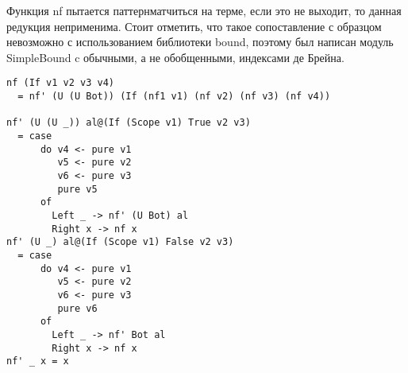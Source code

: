 Функция nf пытается паттернматчиться на терме, если это не выходит, то данная редукция неприменима. Стоит отметить, что такое сопоставление с образцом невозможно с использованием библиотеки bound\cite{bound}, поэтому был написан модуль SimpleBound c обычными, а не обобщенными, индексами де Брейна.


\begin{lstlisting}[caption={Приведение в нормальную форму пытается применить все редукции данного функционального символа},captionpos=b, frame=single, float, floatplacement=H]
nf (If v1 v2 v3 v4)
  = nf' (U (U Bot)) (If (nf1 v1) (nf v2) (nf v3) (nf v4))

nf' (U (U _)) al@(If (Scope v1) True v2 v3)
  = case
      do v4 <- pure v1
         v5 <- pure v2
         v6 <- pure v3
         pure v5
      of
        Left _ -> nf' (U Bot) al
        Right x -> nf x
nf' (U _) al@(If (Scope v1) False v2 v3)
  = case
      do v4 <- pure v1
         v5 <- pure v2
         v6 <- pure v3
         pure v6
      of
        Left _ -> nf' Bot al
        Right x -> nf x
nf' _ x = x
\end{lstlisting}
